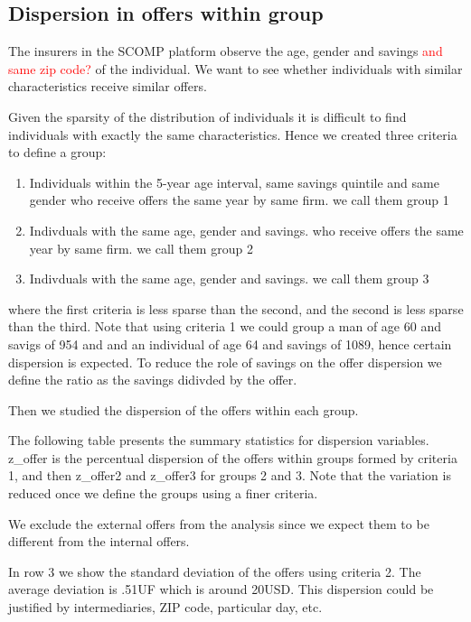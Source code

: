 \documentclass[12pt]{article}
\begin{document}
\subsection{Dispersion in offers within group}

The insurers in the SCOMP platform observe the age, gender and savings \textcolor{red}{and same zip code?} of the individual. We want to see whether individuals with similar characteristics receive similar offers. 

Given the sparsity of the distribution of individuals it is difficult to find individuals with exactly the same characteristics. Hence we created three criteria to define a group: 
\begin{enumerate}
    \item Individuals within the 5-year age interval, same savings quintile and same gender who receive offers the same year by same firm. we call them group 1  
    \item Indivduals with the same age, gender and savings. who receive offers the same year by same firm. we call them group 2
    \item   Indivduals with the same age, gender and savings. we call them group 3
\end{enumerate}
where the first criteria is less sparse than the second, and the second is less sparse than the third. 
Note that using criteria 1 we could group a man of age 60 and savigs of 954 and and an individual of age 64 and savings of 1089, hence certain dispersion is expected. To reduce the role of savings on the offer dispersion we define the ratio as the savings didivded by the offer. 

Then we studied the dispersion of the offers within each group. 

The following table presents the summary statistics for dispersion variables. 
z\_offer is the percentual dispersion of the offers within groups formed by criteria 1, and then z\_offer2 and z\_offer3 for groups 2 and 3. Note that the variation is reduced once we define the groups using a finer criteria.

We exclude the external offers from the analysis since we expect them to be different from the internal offers. 


In row 3 we show the standard deviation of the offers using criteria 2. The average deviation is .51UF which is around 20USD. This dispersion could be justified by intermediaries, ZIP code, particular day, etc. 


\end{document}
